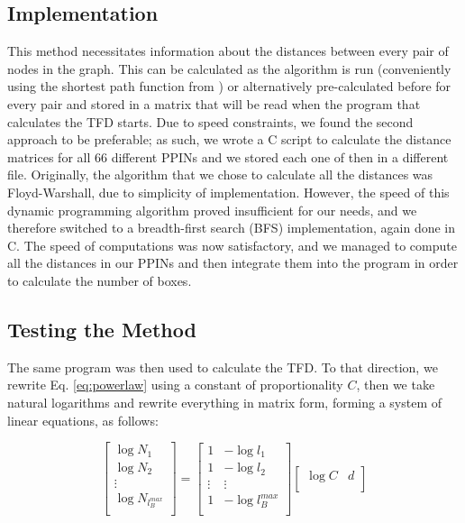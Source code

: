 \subsection{Implementation}

This method necessitates information about the distances between every pair of nodes in the graph. This can be calculated as the algorithm is run (conveniently using the shortest path function from \NX) or alternatively pre-calculated before for every pair and stored in a matrix that will be read when the program that calculates the TFD starts. Due to speed constraints, we found the second approach to be preferable; as such, we wrote a C script to calculate the distance matrices for all $66$ different PPINs and we stored each one of then in a different file. Originally, the algorithm that we chose to calculate all the distances was Floyd-Warshall, due to simplicity of implementation. However, the speed of this dynamic programming algorithm proved insufficient for our needs, and we therefore switched to a breadth-first search (BFS) implementation, again done in C. The speed of computations was now satisfactory, and we managed to compute all the distances in our PPINs and then integrate them into the \PY program in order to calculate the number of boxes.

\subsection{Testing the Method}

The same \PY program was then used to calculate the TFD. To that direction, we rewrite Eq. \ref{eq:powerlaw} using a constant of proportionality $C$, then we take natural logarithms and rewrite everything in matrix form, forming a system of linear equations, as follows:

\begin{equation} \begin{bmatrix}
  \log N_1 \\
  \log N_2 \\
  \vdots \\
  \log N_{l_B^{max}} \\
\end{bmatrix} = \begin{bmatrix}
  1 & -\log l_1 \\
  1 & -\log l_2 \\
  \vdots & \vdots  \\
  1 & -\log l_B^{max} \\
\end{bmatrix}
\begin{bmatrix}
  \log C & d \\
\end{bmatrix}
\end{equation}

